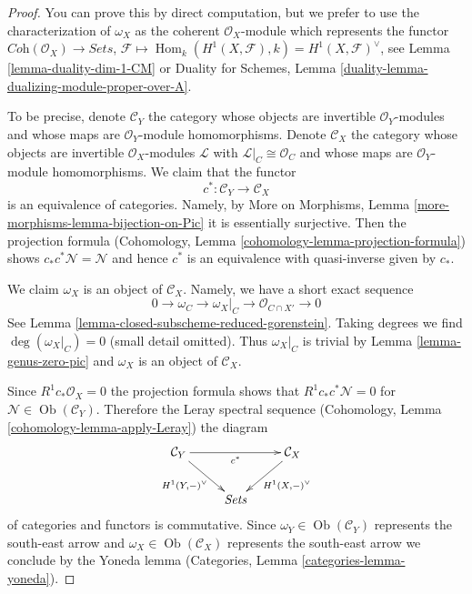\documentclass[10pt,a4paper]{amsart}
\theoremstyle{plain}
\theoremstyle{definition}
\theoremstyle{remark}
\numberwithin{equation}{subsection}
\def\Hom{\mathop{\mathrm{Hom}}\nolimits}
\def\Ob{\mathop{\mathrm{Ob}}\nolimits}
\begin{document}
\begin{proof}
You can prove this by direct computation, but we prefer to use the
characterization of $\omega_X$ as the coherent $\mathcal{O}_X$-module
which represents the functor
$\textit{Coh}(\mathcal{O}_X) \to \textit{Sets}$,
$\mathcal{F} \mapsto \Hom_k(H^1(X, \mathcal{F}), k) =
H^1(X, \mathcal{F})^\vee$, see
Lemma \ref{lemma-duality-dim-1-CM} or
Duality for Schemes, Lemma
\ref{duality-lemma-dualizing-module-proper-over-A}.

\medskip\noindent
To be precise, denote $\mathcal{C}_Y$ the category whose objects are
invertible $\mathcal{O}_Y$-modules and whose maps are
$\mathcal{O}_Y$-module homomorphisms. Denote $\mathcal{C}_X$ the category
whose objects are invertible $\mathcal{O}_X$-modules $\mathcal{L}$ with
$\mathcal{L}|_C \cong \mathcal{O}_C$ and whose maps are
$\mathcal{O}_Y$-module homomorphisms. We claim that the functor
$$
c^* : \mathcal{C}_Y \to \mathcal{C}_X
$$
is an equivalence of categories. Namely, by
More on Morphisms, Lemma \ref{more-morphisms-lemma-bijection-on-Pic}
it is essentially surjective. Then the projection formula
(Cohomology, Lemma \ref{cohomology-lemma-projection-formula})
shows $c_*c^*\mathcal{N} = \mathcal{N}$ and hence $c^*$
is an equivalence with quasi-inverse given by $c_*$.

\medskip\noindent
We claim $\omega_X$ is an object of $\mathcal{C}_X$. Namely, we have a
short exact sequence
$$
0 \to \omega_C \to \omega_X|_C \to \mathcal{O}_{C \cap X'} \to 0
$$
See Lemma \ref{lemma-closed-subscheme-reduced-gorenstein}.
Taking degrees we find $\deg(\omega_X|_C) = 0$ (small detail omitted).
Thus $\omega_X|_C$ is trivial by Lemma \ref{lemma-genus-zero-pic}
and $\omega_X$ is an object of $\mathcal{C}_X$.

\medskip\noindent
Since $R^1c_*\mathcal{O}_X = 0$ the projection formula shows that
$R^1c_*c^*\mathcal{N} = 0$ for $\mathcal{N} \in \Ob(\mathcal{C}_Y)$.
Therefore the Leray spectral sequence
(Cohomology, Lemma \ref{cohomology-lemma-apply-Leray})
the diagram
$$
\xymatrix{
\mathcal{C}_Y \ar[rr]_{c^*} \ar[dr]_{H^1(Y, -)^\vee} & &
\mathcal{C}_X \ar[ld]^{H^1(X, -)^\vee} \\
& \textit{Sets}
}
$$
of categories and functors is commutative. Since
$\omega_Y \in \Ob(\mathcal{C}_Y)$ represents the south-east arrow and
$\omega_X \in \Ob(\mathcal{C}_X)$ represents the south-east arrow
we conclude by the Yoneda lemma
(Categories, Lemma \ref{categories-lemma-yoneda}).
\end{proof}
\end{document}
